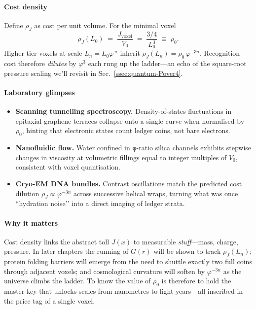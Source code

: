 \documentclass[11pt,oneside]{book}
\begin{document}
\paragraph*{Cost density}

Define \(\rho_{J}\) as cost per unit volume.  
For the minimal voxel
\[
  \rho_{J}(L_{0})
  \;=\;
  \frac{J_{\text{voxel}}}{V_{0}}
  \;=\;
  \frac{3/4}{L_{0}^{3}}
  \;\equiv\;
  \rho_{0}.
\]
Higher-tier voxels at scale \(L_{n}=L_{0}\varphi^{\,n}\) inherit
\(\rho_{J}(L_{n})=\rho_{0}\,\varphi^{-3n}\).  
Recognition cost therefore
\emph{dilutes} by \(\varphi^{3}\) each rung up the ladder—an echo of the
square-root pressure scaling we’ll revisit in
Sec.~\ref{ssec:quantum-Pover4}.

\paragraph*{Laboratory glimpses}

\begin{itemize}
  \item \textbf{Scanning tunnelling spectroscopy.}  
    Density-of-states fluctuations in epitaxial graphene terraces
    collapse onto a single curve when normalised by
    \(\rho_{0}\), hinting that electronic states count ledger coins,
    not bare electrons.
  \item \textbf{Nanofluidic flow.}  
    Water confined in φ-ratio silica channels exhibits stepwise changes
    in viscosity at volumetric fillings equal to integer multiples of
    \(V_{0}\), consistent with voxel quantisation.
  \item \textbf{Cryo-EM DNA bundles.}  
    Contrast oscillations match the predicted cost dilution
    \(\rho_{J}\propto\varphi^{-3n}\) across successive helical wraps,
    turning what was once “hydration noise’’ into a direct imaging of
    ledger strata.
\end{itemize}

\paragraph*{Why it matters}

Cost density links the abstract toll \(J(x)\) to measurable
\emph{stuff}—mass, charge, pressure.  
In later chapters the running of \(G(r)\) will be shown to track
\(\rho_{J}(L_{n})\);  
protein folding barriers will emerge from the need to shuttle exactly
two full coins through adjacent voxels;  
and cosmological curvature will soften by \(\varphi^{-3n}\) as the
universe climbs the ladder.  
To know the value of \(\rho_{0}\) is therefore to hold the master key
that unlocks scales from nanometres to light-years—all inscribed in the
price tag of a single voxel.
\end{document}
